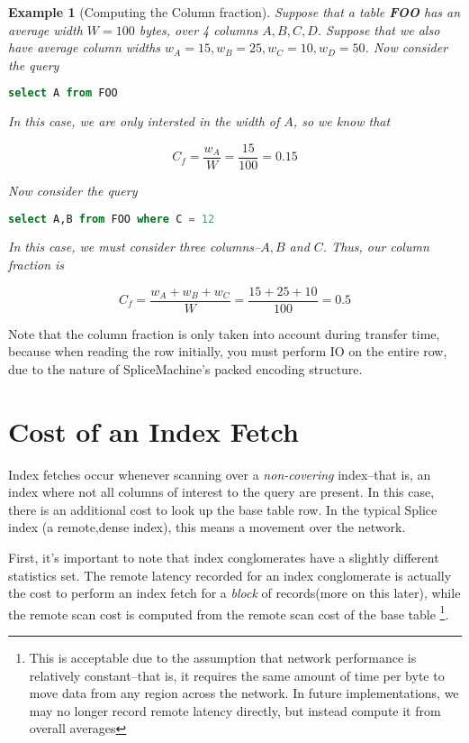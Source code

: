\documentclass[10pt]{amsart}
\newtheorem{exmp}{Example}[section]
\begin{document}
\begin{exmp}[Computing the Column fraction]
				Suppose that a table \textbf{FOO} has an average width $W= 100$ bytes, over 4 columns $A,B,C,D$. Suppose that we also have average column widths $w_A = 15,w_B = 25,w_C = 10,w_D = 50$. Now consider the query

\begin{lstlisting}[frame=single, language=SQL]
select A from FOO
\end{lstlisting}
In this case, we are only intersted in the width of $A$, so we know that 

\begin{displaymath}
				C_f = \frac{w_A}{W} = \frac{15}{100} = 0.15 
\end{displaymath}

Now consider the query
\begin{lstlisting}[frame=single, language=SQL]
select A,B from FOO where C = 12
\end{lstlisting}
In this case, we must consider three columns--$A,B$ and $C$. Thus, our column fraction is

\begin{displaymath}
				C_f = \frac{w_A+w_B+w_C}{W} = \frac{15+25+10}{100} = 0.5
\end{displaymath}

\end{exmp}

Note that the column fraction is only taken into account during transfer time, because when reading the row initially, you must perform IO on the entire row, due to the nature of SpliceMachine's packed encoding structure.

\section{Cost of an Index Fetch}
Index fetches occur whenever scanning over a \emph{non-covering} index--that is, an index where not all columns of interest to the query are present. In this case, there is an additional cost to look up the base table row. In the typical Splice index (a remote,dense index), this means a movement over the network.

First, it's important to note that index conglomerates have a slightly different statistics set. The remote latency recorded for an index conglomerate is actually the cost to perform an index fetch for a \emph{block} of records(more on this later), while the remote scan cost is computed from the remote scan cost of the base table \footnote{This is acceptable due to the assumption that network performance is relatively constant--that is, it requires the same amount of time per byte to move data from any region across the network. In future implementations, we may no longer record remote latency directly, but instead compute it from overall averages}.
\end{document}
